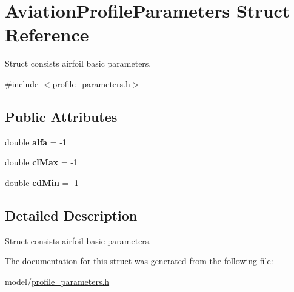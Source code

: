\hypertarget{struct_aviation_profile_parameters}{}\section{Aviation\+Profile\+Parameters Struct Reference}
\label{struct_aviation_profile_parameters}


Struct consists airfoil basic parameters.  




{\ttfamily \#include $<$profile\+\_\+parameters.\+h$>$}

\subsection*{Public Attributes}
\begin{DoxyCompactItemize}
\item 
\mbox{\label{struct_aviation_profile_parameters_a193e4e8fe42f26ed6352fdf7cb438f7c}} 
double {\bfseries alfa} = -\/1
\item 
\mbox{\label{struct_aviation_profile_parameters_a5aa0cd7099bde735f7fe27020ec9c508}} 
double {\bfseries cl\+Max} = -\/1
\item 
\mbox{\label{struct_aviation_profile_parameters_a8fa1990f36d8bc9be69a5e993bbf1516}} 
double {\bfseries cd\+Min} = -\/1
\end{DoxyCompactItemize}


\subsection{Detailed Description}
Struct consists airfoil basic parameters. 

The documentation for this struct was generated from the following file\+:\begin{DoxyCompactItemize}
\item 
model/\hyperlink{profile__parameters_8h}{profile\+\_\+parameters.\+h}\end{DoxyCompactItemize}
